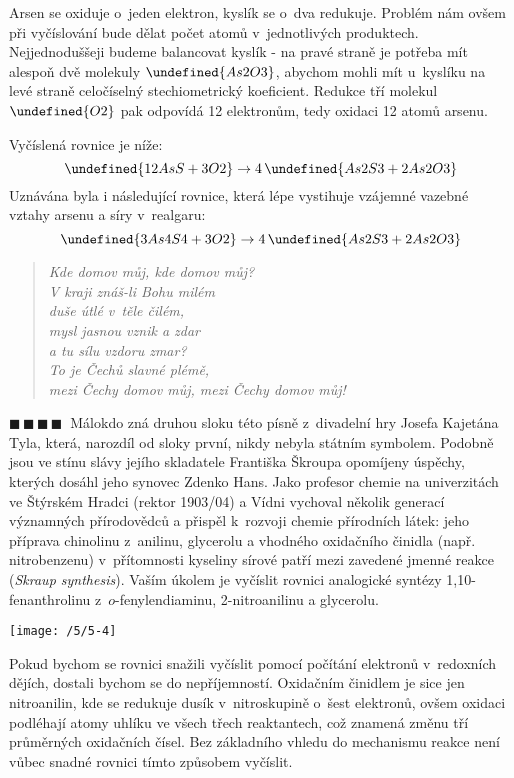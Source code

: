 \documentclass{book}
\let\ch\undefined
\newcommand{\ctyri}{$\blacksquare \, \blacksquare \, \blacksquare \, \blacksquare \; \; $}
\renewenvironment{quotation}{\par}{\par} %
\begin{document}
Arsen se oxiduje o~jeden elektron, kyslík se o~dva redukuje. Problém nám ovšem při vyčíslování bude dělat počet atomů v~jednotlivých produktech. Nejjednoduššeji budeme balancovat kyslík - na pravé straně je potřeba mít alespoň dvě molekuly $\ch{As2O3}$, abychom mohli mít u~kyslíku na levé straně celočíselný stechiometrický koeficient. Redukce tří molekul $\ch{O2}$ pak odpovídá 12 elektronům, tedy oxidaci 12 atomů arsenu.

Vyčíslená rovnice je níže:
\[
\ch{12 AsS + 3 O2}\rightarrow4\,\ch{As2S3 + 2 As2O3}
\]
Uznávána byla i následující rovnice, která lépe vystihuje vzájemné vazebné vztahy arsenu a síry v~realgaru:
\[
\ch{3 As4S4 + 3 O2}\rightarrow4\,\ch{As2S3 + 2 As2O3}
\]


\hrulefill
\begin{verse}
\textit{Kde domov můj, kde domov můj? }\\
 \textit{V kraji znáš-li Bohu milém }\\
 \textit{duše útlé v~těle čilém, }\\
 \textit{mysl jasnou vznik a zdar }\\
 \textit{a tu sílu vzdoru zmar? }\\
 \textit{To je Čechů slavné plémě,}\\
 \textit{mezi Čechy domov můj, mezi Čechy domov můj!} 
\end{verse}
\begin{quotation}
\ctyri Málokdo zná druhou sloku této písně z~divadelní hry Josefa Kajetána
Tyla, která, narozdíl od sloky první, nikdy nebyla státním symbolem.
Podobně jsou ve stínu slávy jejího skladatele Františka Škroupa opomíjeny
úspěchy, kterých dosáhl jeho synovec Zdenko Hans. Jako profesor chemie
na univerzitách ve Štýrském Hradci (rektor 1903/04) a Vídni vychoval
několik generací významných přírodovědců a přispěl k~rozvoji chemie
přírodních látek: jeho příprava chinolinu z~anilinu, glycerolu a
vhodného oxidačního činidla (např. nitrobenzenu) v~přítomnosti kyseliny
sírové patří mezi zavedené jmenné reakce (\textit{Skraup synthesis}).
Vaším úkolem je vyčíslit rovnici analogické syntézy 1,10-fenanthrolinu
z~$o$-fenylendiaminu, 2-nitroanilinu a glycerolu. 
\begin{center}
\texttt{[image: /5/5-4]} 
\par\end{center}

\end{quotation} \dotfill \par 
Pokud bychom se rovnici snažili vyčíslit pomocí počítání elektronů v~redoxních dějích, dostali bychom se do nepříjemností. Oxidačním činidlem je sice jen nitroanilin, kde se redukuje dusík v~nitroskupině o~šest elektronů, ovšem oxidaci podléhají atomy uhlíku ve všech třech reaktantech, což znamená změnu tří průměrných oxidačních čísel. Bez základního vhledu do mechanismu reakce není vůbec snadné rovnici tímto způsobem vyčíslit.
\end{document}
